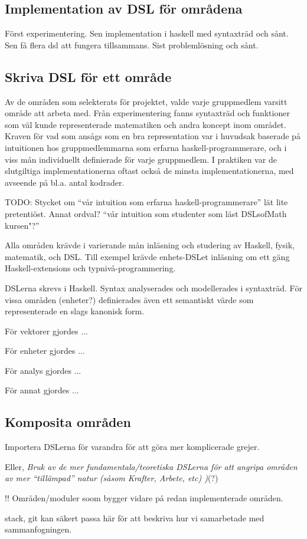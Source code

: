 \begin{binge}
  \section{Implementation av DSL för områdena}

  Först experimentering. Sen implementation i haskell med syntaxträd
  och sånt. Sen få flera dsl att fungera tillsammans. Sist
  problemlösning och sånt.

  \subsection{Skriva DSL för ett område}

  \begin{draft}
    Av de områden som selekterats för projektet, valde varje gruppmedlem
    varsitt område att arbeta med. Från experimentering fanns syntaxträd
    och funktioner som väl kunde representerade matematiken och andra
    koncept inom området. Kraven för vad som ansågs som en bra
    representation var i huvudsak baserade på intuitionen hos
    gruppmedlemmarna som erfarna haskell-programmerare, och i viss mån
    individuellt definierade för varje gruppmedlem. I praktiken var de
    slutgiltiga implementationerna oftast också de minsta
    implementationerna, med avseende på bl.a. antal kodrader.

    TODO: Stycket om ``vår intuition som erfarna haskell-programmerare''
    lät lite pretentiöst. Annat ordval? ``vår intuition som studenter
    som läst DSLsofMath kursen"?''
  \end{draft}

  Alla områden krävde i varierande mån inläsning och studering av
  Haskell, fysik, matematik, och DSL. Till exempel krävde enhets-DSLet
  inläsning om ett gäng Haskell-extensions och typnivå-programmering.

  DSLerna skrevs i Haskell. Syntax analyserades och modellerades i
  syntaxträd. För vissa områden (enheter?) definierades även ett
  semantiskt värde som representerade en slags kanonisk form.

  För vektorer gjordes ...

  För enheter gjordes ...

  För analys gjordes ...

  För annat gjordes ...

  \subsection{Komposita områden}

  Importera DSLerna för varandra för att göra mer komplicerade grejer.

  Eller, \emph{Bruk av de mer fundamentala/teoretiska DSLerna för att
    angripa områden av mer ``tillämpad'' natur (såsom Krafter, Arbete,
    etc) )}(?)

  !! Områden/moduler soom bygger vidare på redan implementerade områden.

  stack, git kan säkert passa här för att beskriva hur vi samarbetade
  med sammanfogningen.
\end{binge}

